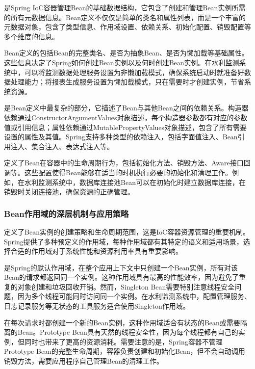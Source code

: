 是Spring IoC容器管理Bean的基础数据结构，它包含了创建和管理Bean实例所需的所有元数据信息。Bean定义不仅仅是简单的类名和属性列表，而是一个丰富的元数据对象，包含了类型信息、作用域设置、依赖关系、初始化配置、销毁配置等多个维度的信息。

Bean定义的包括Bean的完整类名、是否为抽象Bean、是否为懒加载等基础属性。这些信息决定了Spring如何创建Bean实例以及何时创建Bean实例。在水利监测系统中，可以将监测数据处理服务设置为非懒加载模式，确保系统启动时就准备好数据处理能力；将报表生成服务设置为懒加载模式，只在需要时才创建实例，节省系统资源。

是Bean定义中最复杂的部分，它描述了Bean与其他Bean之间的依赖关系。构造器依赖通过ConstructorArgumentValues对象描述，每个构造器参数都有对应的参数值或引用信息；属性依赖通过MutablePropertyValues对象描述，包含了所有需要设置的属性及其值。Spring支持多种类型的依赖注入，包括字面值注入、Bean引用注入、集合注入、表达式注入等。

定义了Bean在容器中的生命周期行为，包括初始化方法、销毁方法、Aware接口回调等。这些配置使得Bean能够在适当的时机执行必要的初始化和清理工作。例如，在水利监测系统中，数据库连接池Bean可以在初始化时建立数据库连接，在销毁时关闭连接池，确保资源的正确管理。

\hypertarget{beanux4f5cux7528ux57dfux7684ux6df1ux5c42ux673aux5236ux4e0eux5e94ux7528ux7b56ux7565}{%
\subsubsection{Bean作用域的深层机制与应用策略}\label{beanux4f5cux7528ux57dfux7684ux6df1ux5c42ux673aux5236ux4e0eux5e94ux7528ux7b56ux7565}}

定义了Bean实例的创建策略和生命周期范围，这是IoC容器资源管理的重要机制。Spring提供了多种预定义的作用域，每种作用域都有其特定的语义和适用场景，选择合适的作用域对于系统性能和资源利用率具有重要影响。

是Spring的默认作用域，在整个应用上下文中只创建一个Bean实例，所有对该Bean的请求都返回同一个实例。这种作用域具有最高的性能效率，因为避免了重复的对象创建和垃圾回收开销。然而，Singleton Bean需要特别注意线程安全问题，因为多个线程可能同时访问同一个实例。在水利监测系统中，配置管理服务、日志记录服务等无状态的工具服务适合使用Singleton作用域。

在每次请求时都创建一个新的Bean实例，这种作用域适合有状态的Bean或需要隔离的Bean。Prototype Bean具有天然的线程安全性，因为每个线程都有自己的实例，但同时也带来了更高的资源消耗。需要注意的是，Spring容器不管理Prototype Bean的完整生命周期，容器负责创建和初始化Bean，但不会自动调用销毁方法，需要应用程序自己管理Bean的清理工作。


